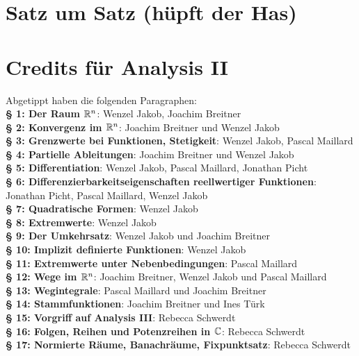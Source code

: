 \documentclass[a4paper,oneside,DIV15,BCOR12mm,chapterprefix=true,headings=onelinechapter]{scrbook}
\begin{document}
\appendix
\chapter{Satz um Satz (hüpft der Has)}

\renewcommand{\indexname}{Stichwortverzeichnis}
\printindex

\chapter{Credits für Analysis II}
Abgetippt haben die folgenden Paragraphen:\\
\textbf{§ 1: Der Raum $\mathbb{R}^n$}: Wenzel Jakob, Joachim Breitner\\
\textbf{§ 2: Konvergenz im $\mathbb{R}^n$}: Joachim Breitner und Wenzel Jakob\\
\textbf{§ 3: Grenzwerte bei Funktionen, Stetigkeit}: Wenzel Jakob, Pascal Maillard\\
\textbf{§ 4: Partielle Ableitungen}: Joachim Breitner und Wenzel Jakob\\
\textbf{§ 5: Differentiation}: Wenzel Jakob, Pascal Maillard, Jonathan Picht\\
\textbf{§ 6: Differenzierbarkeitseigenschaften reellwertiger Funktionen}: Jonathan Picht, Pascal Maillard, Wenzel Jakob\\
\textbf{§ 7: Quadratische Formen}: Wenzel Jakob\\
\textbf{§ 8: Extremwerte}: Wenzel Jakob\\
\textbf{§ 9: Der Umkehrsatz}: Wenzel Jakob und Joachim Breitner\\
\textbf{§ 10: Implizit definierte Funktionen}: Wenzel Jakob\\
\textbf{§ 11: Extremwerte unter Nebenbedingungen}: Pascal Maillard\\
\textbf{§ 12: Wege im $\mathbb{R}^n$}: Joachim Breitner, Wenzel Jakob und Pascal Maillard\\
\textbf{§ 13: Wegintegrale}: Pascal Maillard und Joachim Breitner\\
\textbf{§ 14: Stammfunktionen}: Joachim Breitner und Ines Türk\\
\textbf{§ 15: Vorgriff auf Analysis III}: Rebecca Schwerdt\\
\textbf{§ 16: Folgen, Reihen und Potenzreihen in $\mathbb{C}$}: Rebecca Schwerdt\\
\textbf{§ 17: Normierte Räume, Banachräume, Fixpunktsatz}: Rebecca Schwerdt\\
\end{document}
